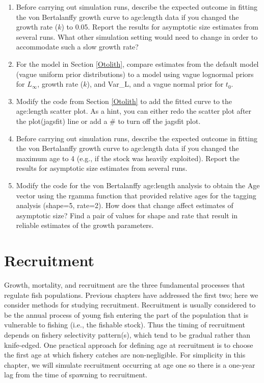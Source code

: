 \documentclass[
]{krantz}
\begin{document}
\begin{enumerate}
\def\labelenumi{\arabic{enumi}.}
\item
  Before carrying out simulation runs, describe the expected outcome in fitting the von Bertalanffy growth curve to age:length data if you changed the growth rate (\(k\)) to 0.05. Report the results for asymptotic size estimates from several runs. What other simulation setting would need to change in order to accommodate such a slow growth rate?
\item
  For the model in Section \ref{Otolith}, compare estimates from the default model (vague uniform prior distributions) to a model using vague lognormal priors for \(L_\infty\), growth rate (\(k\)), and Var\_L, and a vague normal prior for \(t_0\).
\item
  Modify the code from Section \ref{Otolith} to add the fitted curve to the age:length scatter plot. As a hint, you can either redo the scatter plot after the plot(jagsfit) line or add a \# to turn off the jagsfit plot.
\item
  Before carrying out simulation runs, describe the expected outcome in fitting the von Bertalanffy growth curve to age:length data if you changed the maximum age to 4 (e.g., if the stock was heavily exploited). Report the results for asymptotic size estimates from several runs.
\item
  Modify the code for the von Bertalanffy age:length analysis to obtain the Age vector using the rgamma function that provided relative ages for the tagging analysis (shape=5, rate=2). How does that change affect estimates of asymptotic size? Find a pair of values for shape and rate that result in reliable estimates of the growth parameters.
\end{enumerate}

\hypertarget{Recruit}{%
\chapter{Recruitment}\label{Recruit}}

Growth, mortality, and recruitment are the three fundamental processes that regulate fish populations. Previous chapters have addressed the first two; here we consider methods for studying recruitment. Recruitment is usually considered to be the annual process of young fish entering the part of the population that is vulnerable to fishing (i.e., the fishable stock). Thus the timing of recruitment depends on fishery selectivity pattern(s), which tend to be gradual rather than knife-edged. One practical approach for defining age at recruitment is to choose the first age at which fishery catches are non-negligible. For simplicity in this chapter, we will simulate recruitment occurring at age one so there is a one-year lag from the time of spawning to recruitment.
\end{document}
